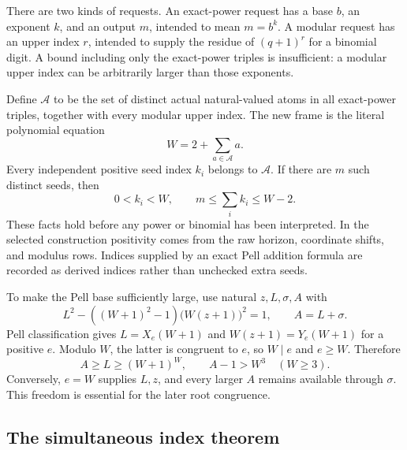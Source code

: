 \documentclass[11pt,letterpaper]{article}
\theoremstyle{remark}\newtheorem{remark}[theorem]{Remark}
\begin{document}
There are two kinds of requests.  An exact-power request has a base $b$,
an exponent $k$, and an output $m$, intended to mean $m=b^k$.  A modular
request has an upper index $r$, intended to supply the residue of
$(q+1)^r$ for a binomial digit.  A bound including only the exact-power
triples is insufficient: a modular upper index can be arbitrarily larger
than those exponents.

Define $\mathcal A$ to be the set of distinct actual natural-valued
atoms in all exact-power triples, together with every modular upper
index.  The new frame is the literal polynomial equation
\begin{equation}\label{eq:W}
 W=2+\sum_{a\in\mathcal A}a.
\end{equation}
Every independent positive seed index $k_i$ belongs to $\mathcal A$.
If there are $m$ such distinct seeds, then
\[
 0<k_i<W,\qquad m\le\sum_i k_i\le W-2.
\]
These facts hold before any power or binomial has been interpreted.
In the selected construction positivity comes from the raw horizon,
coordinate shifts, and modulus rows.  Indices supplied by an exact Pell
addition formula are recorded as derived indices rather than unchecked
extra seeds.

To make the Pell base sufficiently large, use natural $z,L,\sigma,A$ with
\begin{equation}\label{eq:scale}
 L^2-((W+1)^2-1)\bigl(W(z+1)\bigr)^2=1,
 \qquad A=L+\sigma.
\end{equation}
Pell classification gives $L=X_e(W+1)$ and
$W(z+1)=Y_e(W+1)$ for a positive $e$.  Modulo $W$, the latter is
congruent to $e$, so $W\mid e$ and $e\ge W$.  Therefore
\begin{equation}\label{eq:large-A}
 A\ge L\ge(W+1)^W,\qquad A-1>W^3\quad(W\ge3).
\end{equation}
Conversely, $e=W$ supplies $L,z$, and every larger $A$ remains available
through $\sigma$.  This freedom is essential for the later root congruence.

\subsection{The simultaneous index theorem}
\end{document}
